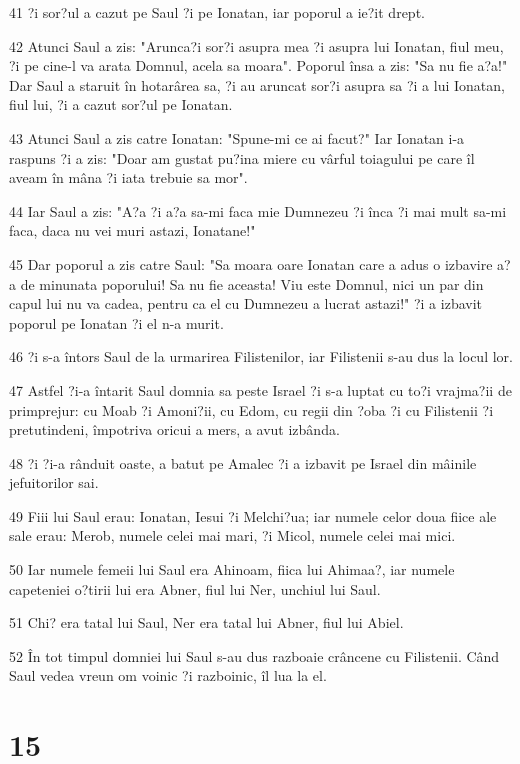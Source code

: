 \par 41 ?i sor?ul a cazut pe Saul ?i pe Ionatan, iar poporul a ie?it drept.
\par 42 Atunci Saul a zis: "Arunca?i sor?i asupra mea ?i asupra lui Ionatan, fiul meu, ?i pe cine-l va arata Domnul, acela sa moara". Poporul însa a zis: "Sa nu fie a?a!" Dar Saul a staruit în hotarârea sa, ?i au aruncat sor?i asupra sa ?i a lui Ionatan, fiul lui, ?i a cazut sor?ul pe Ionatan.
\par 43 Atunci Saul a zis catre Ionatan: "Spune-mi ce ai facut?" Iar Ionatan i-a raspuns ?i a zis: "Doar am gustat pu?ina miere cu vârful toiagului pe care îl aveam în mâna ?i iata trebuie sa mor".
\par 44 Iar Saul a zis: "A?a ?i a?a sa-mi faca mie Dumnezeu ?i înca ?i mai mult sa-mi faca, daca nu vei muri astazi, Ionatane!"
\par 45 Dar poporul a zis catre Saul: "Sa moara oare Ionatan care a adus o izbavire a?a de minunata poporului! Sa nu fie aceasta! Viu este Domnul, nici un par din capul lui nu va cadea, pentru ca el cu Dumnezeu a lucrat astazi!" ?i a izbavit poporul pe Ionatan ?i el n-a murit.
\par 46 ?i s-a întors Saul de la urmarirea Filistenilor, iar Filistenii s-au dus la locul lor.
\par 47 Astfel ?i-a întarit Saul domnia sa peste Israel ?i s-a luptat cu to?i vrajma?ii de primprejur: cu Moab ?i Amoni?ii, cu Edom, cu regii din ?oba ?i cu Filistenii ?i pretutindeni, împotriva oricui a mers, a avut izbânda.
\par 48 ?i ?i-a rânduit oaste, a batut pe Amalec ?i a izbavit pe Israel din mâinile jefuitorilor sai.
\par 49 Fiii lui Saul erau: Ionatan, Iesui ?i Melchi?ua; iar numele celor doua fiice ale sale erau: Merob, numele celei mai mari, ?i Micol, numele celei mai mici.
\par 50 Iar numele femeii lui Saul era Ahinoam, fiica lui Ahimaa?, iar numele capeteniei o?tirii lui era Abner, fiul lui Ner, unchiul lui Saul.
\par 51 Chi? era tatal lui Saul, Ner era tatal lui Abner, fiul lui Abiel.
\par 52 În tot timpul domniei lui Saul s-au dus razboaie crâncene cu Filistenii. Când Saul vedea vreun om voinic ?i razboinic, îl lua la el.

\chapter{15}


